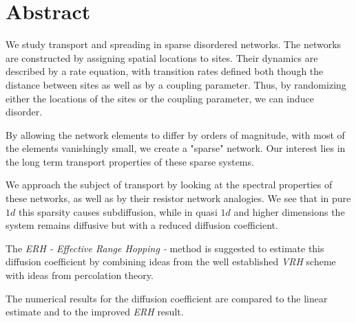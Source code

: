 \chapter*{Abstract}


We study transport and spreading in sparse disordered networks. The networks are 
constructed by assigning spatial locations to sites. Their dynamics are
described by a rate equation, with transition rates
defined both though the distance between sites as well as by a
coupling parameter. Thus, by randomizing either the locations of the sites
or the coupling parameter, we can induce disorder.



By allowing the network elements to differ by orders of magnitude,
with most of the elements vanishingly small, we create a "sparse" network.
Our interest lies in the long term transport properties of these sparse systems. 


We approach the subject of transport by looking at the spectral properties
of these networks, as well as by their resistor network analogies. We see 
that in pure $1d$ this sparsity causes subdiffusion, while in quasi $1d$ and
higher dimensions the system remains diffusive but with a reduced diffusion coefficient. 


The \emph{ERH - Effective Range Hopping -} method is suggested to estimate this diffusion 
coefficient by combining ideas from the well established \emph{VRH} scheme with 
ideas from percolation theory.


The numerical results for the diffusion coefficient are compared to the linear
estimate and to the improved \emph{ERH} result.
